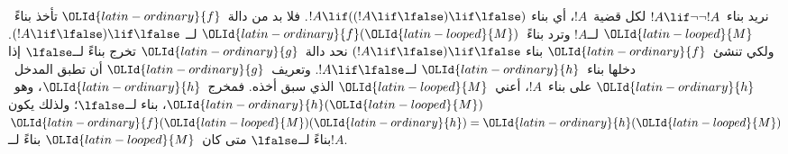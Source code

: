 \documentclass[../../../include/open-logic-section]{subfiles}
\begin{document}
\begin{ex}
نريد بناء~$!A \lif \lnot \lnot !A$ لكل قضية~$!A$، أي بناء
$!A \lif ((!A \lif \lfalse) \lif \lfalse)$. فلا بد من دالة~${\OLId{latin-ordinary}{f}}$ تأخذ
بناءً~${\OLId{latin-looped}{M}}$ لــ$!A$ وترد بناءً~${\OLId{latin-ordinary}{f}}({\OLId{latin-looped}{M}})$ لــ
$(!A \lif \lfalse) \lif \lfalse$. ولكي تنشئ~${\OLId{latin-ordinary}{f}}$ بناء
$(!A \lif \lfalse) \lif \lfalse$ نحد دالة~${\OLId{latin-ordinary}{g}}$
تخرج بناءً لــ$\lfalse$ إذا دخلها بناء~${\OLId{latin-ordinary}{h}}$ لــ$!A \lif \lfalse$.
وتعريف~${\OLId{latin-ordinary}{g}}$ أن تطبق المدخل~${\OLId{latin-ordinary}{h}}$ على بناء~$!A$، أعني~${\OLId{latin-looped}{M}}$ الذي سبق أخذه.
فمخرج~${\OLId{latin-ordinary}{h}}$، وهو~${\OLId{latin-ordinary}{h}}({\OLId{latin-looped}{M}})$، بناء لــ$\lfalse$؛ ولذلك يكون
${\OLId{latin-ordinary}{f}}({\OLId{latin-looped}{M}})({\OLId{latin-ordinary}{h}}) = {\OLId{latin-ordinary}{h}}({\OLId{latin-looped}{M}})$ بناءً لــ$\lfalse$ متى كان~${\OLId{latin-looped}{M}}$ بناءً لــ$!A$.
\end{ex}
\end{document}
